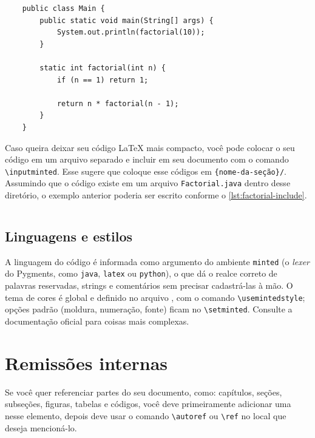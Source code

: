 \begin{listing}[htb]
  \begin{verbatim}
    public class Main {
        public static void main(String[] args) {
            System.out.println(factorial(10));
        }

        static int factorial(int n) {
            if (n == 1) return 1;

            return n * factorial(n - 1);
        }
    }
  \end{verbatim}
  \caption{Fatorial}
  \label{lst:factorial-inline-output}
\end{listing}

Caso queira deixar seu código \LaTeX{} mais compacto, você pode colocar o seu código em um arquivo separado e incluir em seu documento com o comando \texttt{\textbackslash{}inputminted}. Esse \template{} sugere que coloque esse códigos em \contentdir{}\texttt{\{nome-da-seção\}/}\codedir. Assumindo que o código existe em um arquivo \texttt{Factorial.java} dentro desse diretório, o exemplo anterior poderia ser escrito conforme o \autoref{lst:factorial-include}.

\begin{listing}[htb]
  \inputminted{latex}{\CurrentFilePath/res/code/factorial-include.tex}
  \caption{Inclusão de código através de um arquivo externo}
  \label{lst:factorial-include}
\end{listing}

\subsection{Linguagens e estilos}

A linguagem do código é informada como argumento do ambiente \texttt{minted} (o \emph{lexer} do Pygments, como \texttt{java}, \texttt{latex} ou \texttt{python}), o que dá o realce correto de palavras reservadas, strings e comentários sem precisar cadastrá-las à mão. O tema de cores é global e definido no arquivo \pkgfile, com o comando \texttt{\textbackslash{}usemintedstyle}; opções padrão (moldura, numeração, fonte) ficam no \texttt{\textbackslash{}setminted}. Consulte a documentação oficial para coisas mais complexas.

\section{Remissões internas} \label{sec:cross-ref}

Se você quer referenciar partes do seu documento, como: capítulos, seções, subseções, figuras, tabelas e códigos, você deve primeiramente adicionar uma  nesse elemento, depois deve usar o comando \texttt{\textbackslash{}autoref} ou \texttt{\textbackslash{}ref} no local que deseja mencioná-lo.

